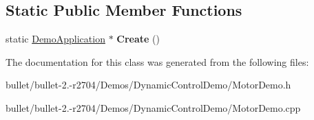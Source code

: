 \subsection*{Static Public Member Functions}
\begin{DoxyCompactItemize}
\item 
\hypertarget{class_motor_demo_a5412ba625e84decb3ef5083013b7c48b}{static \hyperlink{class_demo_application}{Demo\+Application} $\ast$ {\bfseries Create} ()}\label{class_motor_demo_a5412ba625e84decb3ef5083013b7c48b}

\end{DoxyCompactItemize}


The documentation for this class was generated from the following files\+:\begin{DoxyCompactItemize}
\item 
bullet/bullet-\/2.-\/r2704/\+Demos/\+Dynamic\+Control\+Demo/Motor\+Demo.\+h\item 
bullet/bullet-\/2.-\/r2704/\+Demos/\+Dynamic\+Control\+Demo/Motor\+Demo.\+cpp\end{DoxyCompactItemize}
